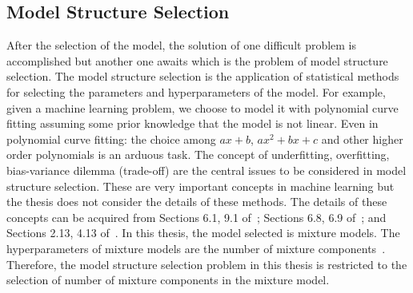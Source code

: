 \subsection{Model Structure Selection}
\label{ss:modelstructureselection}
After the selection of the model, the solution of one difficult problem is accomplished but another one awaits which is the problem of model structure selection. The model structure selection is the application of statistical methods for selecting the parameters and hyperparameters of the model. For example, given a machine learning problem, we choose to model it with polynomial curve fitting assuming some prior knowledge that the model is not linear. Even in polynomial curve fitting: the choice among $ax+b$, $ax^2+bx+c$ and other higher order polynomials is an arduous task. The concept of underfitting, overfitting, bias-variance dilemma (trade-off) are the central issues to be considered in model structure selection. These are very important concepts in machine learning but the thesis does not consider the details of these methods. The details of these concepts can be acquired from Sections 6.1, 9.1 of~\cite{bishop}; Sections 6.8, 6.9 of~\cite{gruney}; and Sections 2.13, 4.13 of~\cite{hykin}. In this thesis, the model selected is mixture models. The hyperparameters of mixture models are the number of mixture components~\cite{componentdet}. Therefore, the model structure selection problem in this thesis is restricted to the selection of number of mixture components in the mixture model.

